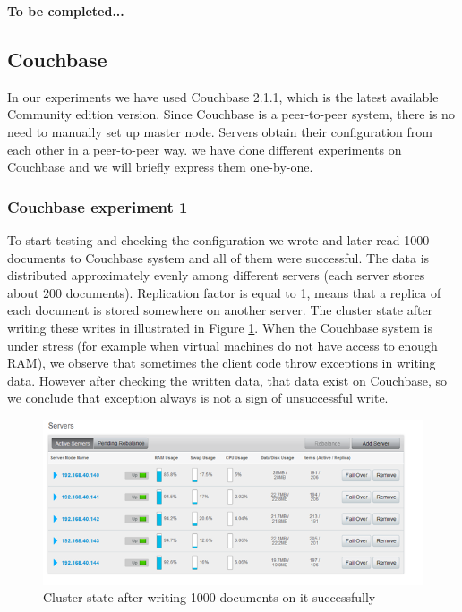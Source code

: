\documentclass[a4paper]{article}
\begin{document}
{\bf To be completed...}

\subsection{Couchbase}

In our experiments we have used Couchbase 2.1.1, which is the latest available Community edition version. 
Since Couchbase is a peer-to-peer system, there is no need to manually set up master node. 
Servers obtain their configuration from each other in a peer-to-peer way.
we have done different experiments on Couchbase and we will briefly express them one-by-one.

\subsubsection{Couchbase experiment 1}
To start testing and checking the configuration we wrote and later read 1000 documents to Couchbase system and all of them were successful. 
The data is distributed approximately evenly among different servers (each server stores about 200 documents).
Replication factor is equal to 1, means that a replica of each document is stored somewhere on another server.
The cluster state after writing these writes in illustrated in Figure \ref{fig:diagram1}.
When the Couchbase system is under stress (for example when virtual machines do not have access to enough RAM), we observe that sometimes the client code throw exceptions in writing data.
However after checking the written data, that data exist on Couchbase, so we conclude that exception always is not a sign of unsuccessful write.  
\begin{figure}[h!]
	\centering
	\includegraphics[width=\textwidth]{diagram1}
	\caption{Cluster state after writing 1000 documents on it successfully}
	\label{fig:diagram1}
\end{figure}
\end{document}
